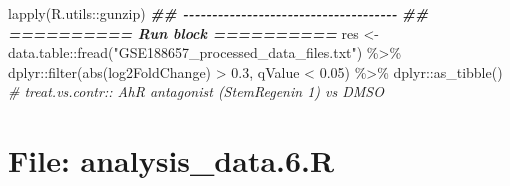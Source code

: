 \documentclass[
]{article}
\newenvironment{Shaded}{\begin{snugshade}}{\end{snugshade}}
\newcommand{\CommentTok}[1]{\textcolor[rgb]{0.56,0.35,0.01}{\textit{#1}}}
\newcommand{\DocumentationTok}[1]{\textcolor[rgb]{0.56,0.35,0.01}{\textbf{\textit{#1}}}}
\newcommand{\FloatTok}[1]{\textcolor[rgb]{0.00,0.00,0.81}{#1}}
\newcommand{\FunctionTok}[1]{\textcolor[rgb]{0.00,0.00,0.00}{#1}}
\newcommand{\NormalTok}[1]{#1}
\newcommand{\OtherTok}[1]{\textcolor[rgb]{0.56,0.35,0.01}{#1}}
\newcommand{\SpecialCharTok}[1]{\textcolor[rgb]{0.00,0.00,0.00}{#1}}
\newcommand{\StringTok}[1]{\textcolor[rgb]{0.31,0.60,0.02}{#1}}
\begin{document}
\begin{Shaded}
\begin{Highlighting}[]
  \FunctionTok{lapply}\NormalTok{(R.utils}\SpecialCharTok{::}\NormalTok{gunzip)}
\DocumentationTok{\#\# {-}{-}{-}{-}{-}{-}{-}{-}{-}{-}{-}{-}{-}{-}{-}{-}{-}{-}{-}{-}{-}{-}{-}{-}{-}{-}{-}{-}{-}{-}{-}{-}{-}{-}{-}{-}{-} }
\DocumentationTok{\#\# ========== Run block ========== }
\NormalTok{res }\OtherTok{\textless{}{-}}\NormalTok{ data.table}\SpecialCharTok{::}\FunctionTok{fread}\NormalTok{(}\StringTok{"GSE188657\_processed\_data\_files.txt"}\NormalTok{) }\SpecialCharTok{\%\textgreater{}\%} 
\NormalTok{  dplyr}\SpecialCharTok{::}\FunctionTok{filter}\NormalTok{(}\FunctionTok{abs}\NormalTok{(log2FoldChange) }\SpecialCharTok{\textgreater{}} \FloatTok{0.3}\NormalTok{, qValue }\SpecialCharTok{\textless{}} \FloatTok{0.05}\NormalTok{) }\SpecialCharTok{\%\textgreater{}\%} 
\NormalTok{  dplyr}\SpecialCharTok{::}\FunctionTok{as\_tibble}\NormalTok{()}
\CommentTok{\# treat.vs.contr:: AhR antagonist (StemRegenin 1) vs DMSO}
\end{Highlighting}
\end{Shaded}

\hypertarget{file-analysis_data.6.r}{%
\section{File: analysis\_data.6.R}\label{file-analysis_data.6.r}}
\end{document}
